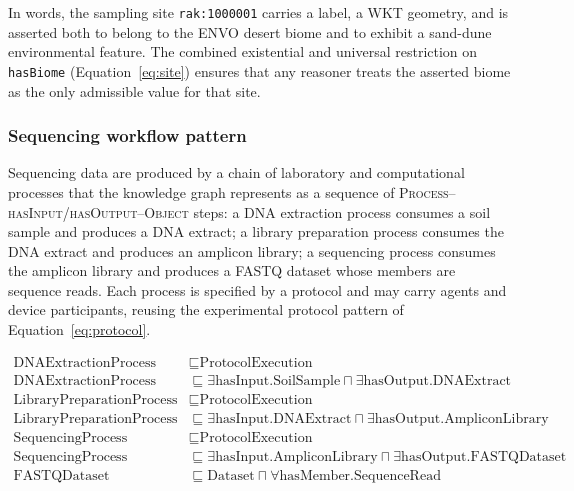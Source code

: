 \documentclass[11pt,a4paper]{article}
\begin{document}
In words, the sampling site \texttt{rak:1000001} carries a label, a
WKT geometry, and is asserted both to belong to the ENVO desert biome
and to exhibit a sand-dune environmental feature. The combined
existential and universal restriction on \texttt{hasBiome}
(Equation~\ref{eq:site}) ensures that any reasoner treats the
asserted biome as the only admissible value for that site.

\subsubsection{Sequencing workflow pattern}

Sequencing data are produced by a chain of laboratory and
computational processes that the knowledge graph represents as a
sequence of \textsc{Process--hasInput/hasOutput--Object} steps: a DNA
extraction process consumes a soil sample and produces a DNA extract;
a library preparation process consumes the DNA extract and produces
an amplicon library; a sequencing process consumes the amplicon
library and produces a FASTQ dataset whose members are sequence reads.
Each process is specified by a protocol and may carry agents and
device participants, reusing the experimental protocol pattern of
Equation~\ref{eq:protocol}.

\begin{align}
    \label{eq:sequencing}
    \text{DNAExtractionProcess} & \sqsubseteq \text{ProtocolExecution} \\
    \text{DNAExtractionProcess} & \sqsubseteq \exists
        \text{hasInput}.\text{SoilSample} \sqcap \exists
        \text{hasOutput}.\text{DNAExtract} \\
    \text{LibraryPreparationProcess} & \sqsubseteq \text{ProtocolExecution} \\
    \text{LibraryPreparationProcess} & \sqsubseteq \exists
        \text{hasInput}.\text{DNAExtract} \sqcap \exists
        \text{hasOutput}.\text{AmpliconLibrary} \\
    \text{SequencingProcess} & \sqsubseteq \text{ProtocolExecution} \\
    \text{SequencingProcess} & \sqsubseteq \exists
        \text{hasInput}.\text{AmpliconLibrary} \sqcap \exists
        \text{hasOutput}.\text{FASTQDataset} \\
    \text{FASTQDataset} & \sqsubseteq \text{Dataset} \sqcap \forall
        \text{hasMember}.\text{SequenceRead}
\end{align}
\end{document}
